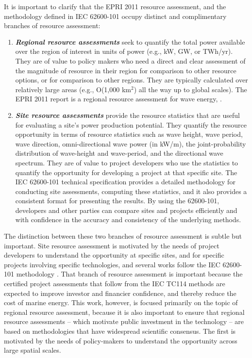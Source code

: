 It is important to clarify that the EPRI 2011 resource assessment, and the methodology defined in IEC 62600-101 occupy distinct and complimentary branches of resource assessment:
\begin{enumerate}
\item {\bf \em Regional resource assessments} seek to quantify the total power available over the region of interest in units of power (e.g., kW, GW, or TWh/yr). 
They are of value to policy makers who need a direct and clear assessment of the magnitude of resource in their region for comparison to other resource options, or for comparison to other regions. They are typically calculated over relatively large areas (e.g., O(1,000 km$^2$) all the way up to global scales). The EPRI 2011 report is a regional resource assessment for wave energy, \citep[e.g., ][]{EPRIwaveresource2011,gunnQuantifyingGlobalWave2012,regueroGlobalWavePower2015,motaWaveEnergyPotential2014}. 
\item {\bf \em Site resource assessments} provide the resource statistics that are useful for evaluating a site’s power production potential. They quantify the resource opportunity in terms of resource statistics such as wave height, wave period, wave direction, omni-directional wave power (in kW/m), the joint-probability distribution of wave-height and wave-period, and the directional wave spectrum. They are of value to project developers who use the statistics to quantify the opportunity for developing a project at that specific site. The IEC 62600-101 technical specification provides a detailed methodology for conducting site assessments, computing these statistics, and it also provides a consistent format for presenting the results. By using the 62600-101, developers and other parties can compare sites and projects efficiently and with confidence in the accuracy and consistency of the underlying methods. 
\end{enumerate}

The distinction between these two branches of resource assessment is subtle but important. Site resource assessment is motivated by the needs of project developers to understand the opportunity at specific sites, and for specific projects involving specific technologies, and several works follow the IEC 62600-101 methodology \citep[e.g., ][]{zhengAssessingChinaSea2013, neillWavePowerVariability2013, sierraWaveEnergyResource2013, robertsonCharacterizingShoreWave2014, yangCharacteristicsVariabilityNearshore2020, lokuliyana_sri_2020}. 
That branch of resource assessment is important because the certified project assessments that follow from the IEC TC114 methods are expected to improve investor and financier confidence, and thereby reduce the cost of marine energy.
This work, however, is focused primarily on the topic of regional resource assessment, because it is also important to ensure that regional resource assessments -- which motivate public investment in the technology -- are based on methodologies that have widespread scientific consensus. The first is motivated by the needs of policy-makers to understand the opportunity across large spatial scales.

